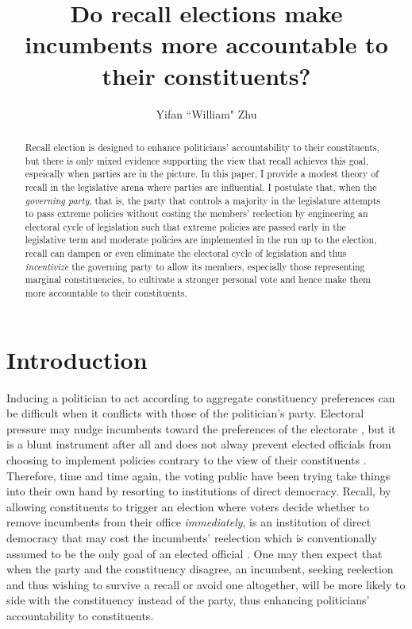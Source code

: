 \documentclass{article}
\title{Do recall elections make incumbents more accountable to their constituents?}
\author{Yifan ``William" Zhu}
\begin{document}
	\maketitle
	\begin{abstract}
		Recall election is designed to enhance politicians' accountability to their constituents,
		but there is only mixed evidence supporting the view that recall achieves this goal,
		espeically when parties are in the picture.
		In this paper,
		I provide a modest theory of recall
		in the legislative arena where parties are influential.
		I postulate that,
		when the \textit{governing party},
		that is, the party that controls a majority
		in the legislature
		attempts to pass extreme policies without costing the members' reelection
		by engineering an electoral cycle of legislation
		such that extreme policies are passed early in the legislative term
		and moderate policies are implemented in the run up to the election,
		recall
		can dampen or even eliminate the electoral cycle of legislation
		and thus \textit{incentivize} the governing party
		to allow its members,
		especially those representing marginal constituencies,
		to cultivate a stronger personal vote
		and hence make them more accountable to their constituents.
	\end{abstract}
	
	
	
	
	
	\section*{Introduction}
	
		Inducing a politician to act according to aggregate constituency preferences
		can be difficult when
		it conflicts with those of the politician's party.
		Electoral pressure may nudge incumbents toward the preferences of the electorate
		\autocite{millerConstituencyInfluenceCongress1963},
		but it is a blunt instrument after all
		and does not alway prevent
		elected officials from choosing to implement policies contrary to the view of their constituents
		\autocite{kirklandIndecisionAmericanLegislatures2018}.
		Therefore, time and time again, the voting public have been trying take things into their own hand
		by resorting to institutions of direct democracy.
		Recall,
		by allowing constituents to trigger an election where voters decide whether to remove incumbents from their office \textit{immediately}, 
		is an institution
		of direct democracy
		that may cost the incumbents' reelection
		which is conventionally assumed to be the only goal of an elected official
		\autocite{mayhewCongressElectoralConnection1974}.
		One may
		then
		expect that 
		when the party and the constituency disagree,
		an incumbent,
		seeking reelection and thus 
		wishing to survive a recall or 
		avoid one altogether,
		will be more likely to side with the constituency instead of the party,
		thus enhancing politicians' accountability to constituents.
		
\end{document}
